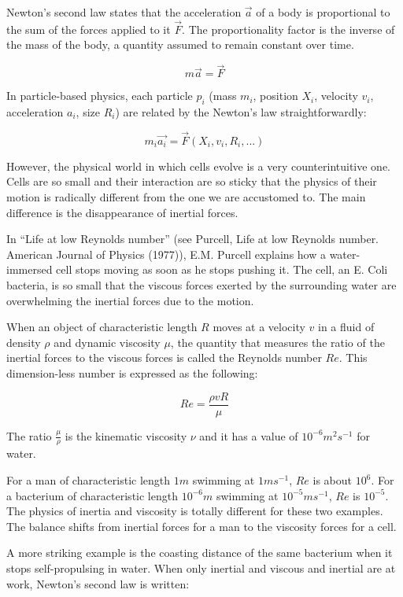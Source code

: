 Newton's second law states that the acceleration $\vec{a}$ of a body is proportional to the sum of the forces applied to it $\vec{F}$. The proportionality factor is the inverse of the mass of the body, a quantity assumed to remain constant over time.

$$ m \vec{a} = \vec{F} $$

In particle-based physics, each particle $p_i$ (mass $m_i$, position $X_i$, velocity $v_i$, acceleration $a_i$, size $R_i$) are related by the Newton's law straightforwardly:

$$m_i \vec{a_i} = \vec{F}(X_i, v_i, R_i, ...)$$

However, the physical world in which cells evolve is a very counterintuitive one. Cells are so small and their interaction are so sticky that the physics of their motion is radically different from the one we are accustomed to. The main difference is the disappearance of inertial forces.

In “Life at low Reynolds number” (see Purcell, Life at low Reynolds number. American Journal of Physics (1977)), E.M. Purcell explains how a water-immersed cell stops moving as soon as he stops pushing it. The cell, an E. Coli bacteria, is so small that the viscous forces exerted by the surrounding water are overwhelming the inertial forces due to the motion. 

When an object of characteristic length $R$ moves at a velocity $v$ in a fluid of density $\rho$ and dynamic viscosity $\mu$, the quantity that measures the ratio of the inertial forces to the viscous forces is called the Reynolds number $Re$. This dimension-less number is expressed as the following:

$$Re = \frac{\rho v R}{\mu}$$

The ratio $\frac{\mu}{\rho}$ is the kinematic viscosity $\nu$ and it has a value of $ 10^{-6} {m}^2 {s}^{-1} $  for water.

For a man of characteristic length $1m$ swimming at $1 m s^{-1}$, $Re$ is about $10^6$. For a bacterium of characteristic length $10^{-6} m$ swimming at $10^{-5} m s^{-1}$, $Re$ is $10^{-5}$. The physics of inertia and viscosity is totally different for these two examples. The balance shifts from inertial forces for a man to the viscosity forces for a cell.

A more striking example is the coasting distance of the same bacterium when it stops self-propulsing in water. When only inertial and viscous and inertial are at work, Newton's second law is written:

